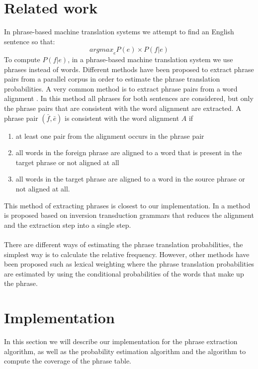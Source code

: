 \documentclass[11pt]{article}
\begin{document}
\section{Related work}
In phrase-based machine translation systems we attempt to find an English sentence so that: 
$$\textit{argmax}_e P(e) \times P(f|e)$$
To compute $P(f|e)$, in a phrase-based machine translation system we use phrases instead of words. Different methods have been proposed to extract phrase pairs from a parallel corpus in order to estimate the phrase translation probabilities. A very common method is to extract phrase pairs from a word alignment \cite{koehn}\cite{theother}. In this method all phrases for both sentences are considered, but only the phrase pairs that are consistent with the word alignment are extracted. A phrase pair $(\bar f,\bar e)$ is consistent with the word alignment $A$ if
\begin{enumerate}
\item at least one pair from the alignment occurs in the phrase pair
\item all words in the foreign phrase are aligned to a word that is present in the target phrase or not aligned at all
\item all words in the target phrase are aligned to a word in the source phrase or not aligned at all.
\end{enumerate} 
This method of extracting phrases is closest to our implementation. In \cite{super} a method is proposed based on inversion transduction grammars that reduces the alignment and the extraction step into a single step. \\\\
There are different ways of estimating the phrase translation probabilities, the simplest way is to calculate the relative frequency. However, other methods have been proposed such as lexical weighting \cite{lexical} where the phrase translation probabilities are estimated by using the conditional probabilities of the words that make up the phrase.

\section{Implementation}
In this section we will describe our implementation for the phrase extraction algorithm, as well as the probability estimation algorithm and the algorithm to compute the coverage of the phrase table. 
\end{document}

